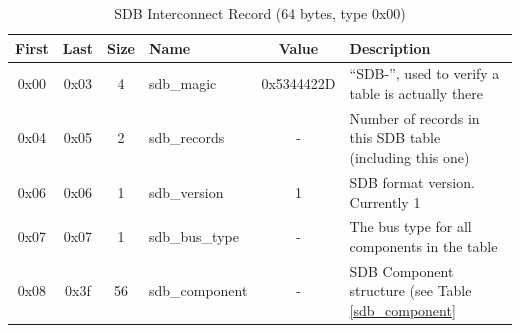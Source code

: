 \documentclass[a4paper, 12pt]{article}
\begin{document}
\begin{center}
  \begin{savenotes}
    \begin{table}[!ht]\footnotesize
      \caption{SDB Interconnect Record (64 bytes, type 0x00)}\label{sdb_interconnect}\centering
        \begin{tabular}{| c | c | c | l | c | p{4cm} |} \hline
        First & Last & Size & Name & Value & Description \\ \hline
        0x00 & 0x03 & 4 & sdb\_magic & 0x5344422D & ``SDB-'', used to verify a table is actually there \\ \hline
        0x04 & 0x05 & 2 & sdb\_records & - & Number of records in this SDB table (including this one) \\ \hline
        0x06 & 0x06 & 1 & sdb\_version & 1 & SDB format version. Currently 1 \\ \hline
        0x07 & 0x07 & 1 & sdb\_bus\_type & - & The bus type for all components in the table \\ \hline
        0x08 & 0x3f & 56 & sdb\_component & - & SDB Component structure (see Table \ref{sdb_component} \\ \hline
        \end{tabular}
    \end{table}
  \end{savenotes}
\end{center}
\end{document}
